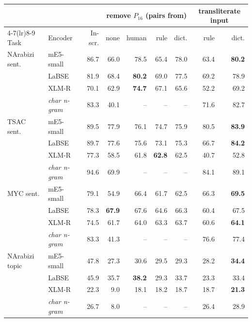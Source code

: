 \begin{tabular}{ll r rrrr rr}
\toprule
 & & & \multicolumn{4}{c}{remove $P_{16}$ (pairs from)} & \multicolumn{2}{c}{transliterate input} \\
\cmidrule(lr){4-7}\cmidrule(lr){8-9}
Task & Encoder & In-scr. & none & human & rule & dict. & rule & dict. \\
\midrule
NArabizi sent. & mE5-small & 86.7 & 66.0 & 78.5 & 65.4 & 78.0 & 63.4 & \textbf{80.2} \\
 & LaBSE & 81.9 & 68.4 & \textbf{80.2} & 69.0 & 77.5 & 69.2 & 78.9 \\
 & XLM-R & 70.1 & 62.9 & \textbf{74.7} & 67.1 & 65.6 & 52.2 & 69.2 \\
 & \textit{char n-gram} & 83.3 & 40.1 & -- & -- & -- & 71.6 & 82.7 \\
\midrule
TSAC sent. & mE5-small & 89.5 & 77.9 & 76.1 & 74.7 & 75.9 & 80.5 & \textbf{83.9} \\
 & LaBSE & 89.7 & 77.6 & 75.6 & 73.1 & 75.3 & 66.7 & \textbf{84.2} \\
 & XLM-R & 77.3 & 58.5 & 61.8 & \textbf{62.8} & 62.5 & 40.7 & 52.8 \\
 & \textit{char n-gram} & 94.6 & 69.9 & -- & -- & -- & 84.1 & 89.1 \\
\midrule
MYC sent. & mE5-small & 79.1 & 54.9 & 66.4 & 61.7 & 62.5 & 66.3 & \textbf{69.5} \\
 & LaBSE & 78.3 & \textbf{67.9} & 67.6 & 64.6 & 66.3 & 60.4 & 67.5 \\
 & XLM-R & 74.5 & 61.7 & 64.0 & 63.3 & 63.7 & 60.6 & \textbf{64.1} \\
 & \textit{char n-gram} & 83.3 & 41.3 & -- & -- & -- & 76.6 & 77.4 \\
\midrule
NArabizi topic & mE5-small & 47.8 & 27.3 & 30.6 & 29.5 & 29.3 & 28.2 & \textbf{34.4} \\
 & LaBSE & 45.9 & 35.7 & \textbf{38.2} & 29.3 & 33.7 & 23.3 & 33.4 \\
 & XLM-R & 22.3 & 9.0 & 18.1 & 18.2 & 18.7 & 18.7 & \textbf{21.3} \\
 & \textit{char n-gram} & 26.7 & 8.0 & -- & -- & -- & 26.4 & 28.9 \\
\bottomrule
\end{tabular}
